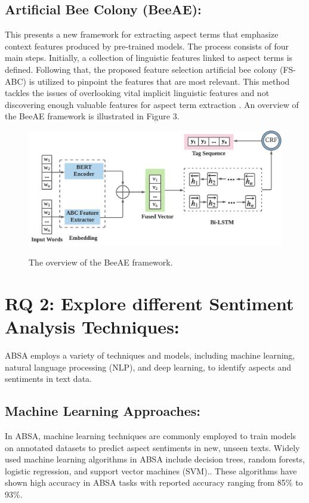\documentclass{article}
\begin{document}
\subsection{Artificial Bee Colony (BeeAE): }
This presents a new framework for extracting aspect terms that emphasize context features produced by pre-trained models. The process consists of four main steps. Initially, a collection of linguistic features linked to aspect terms is defined. Following that, the proposed feature selection artificial bee colony (FS-ABC) is utilized to pinpoint the features that are most relevant. This method tackles the issues of overlooking vital implicit linguistic features and not discovering enough valuable features for aspect term extraction \cite{Shi2022BeeAEEA}. An overview of the BeeAE framework is illustrated in Figure 3.
\begin{figure}
    \centering
    \includegraphics[width=0.5\linewidth]{BeeAE.jpg}
    \caption{The overview of the BeeAE framework.}
    \label{fig: BeeAE framework}
    \cite{Shi2022BeeAEEA}
\end{figure}

\section{RQ 2: Explore different Sentiment Analysis Techniques: }
ABSA employs a variety of techniques and models, including machine learning, natural language processing (NLP), and deep learning, to identify aspects and sentiments in text data. \cite{NazirIssues&Chall2023}

\subsection{Machine Learning Approaches: }
In ABSA, machine learning techniques are commonly employed to train models on annotated datasets to predict aspect sentiments in new, unseen texts. Widely used machine learning algorithms in ABSA include decision trees, random forests, logistic regression, and support vector machines (SVM).\cite{Adagale2023AspectBS}\cite{Horsa2023AspectBasedSA}. These algorithms have shown high accuracy in ABSA tasks with reported accuracy ranging from 85\% to 93\%.\cite{Horsa2023AspectBasedSA}\cite{hua2023systematic}
\end{document}
